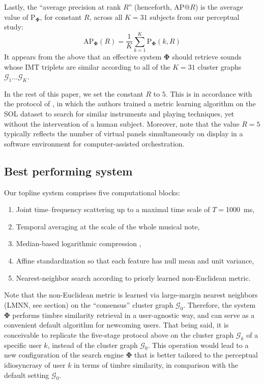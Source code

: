 \documentclass{bmcart}
\newcommand{\lnameref}[1]{%
\bgroup
\let\nmu\MakeLowercase
\nameref{#1}\egroup}
\newcommand{\nmu}{}
\begin{document}
Lastly, the ``average precision at rank $R$'' (henceforth, AP@$R$) is the average value of $\mathrm{P}_{\mathbf{\Phi}}$, for constant $R$, across all $K=31$ subjects from our perceptual study:
\begin{equation}
\mathrm{AP}_{\mathbf{\Phi}}(R) =
\dfrac{1}{K}
\sum_{k=1}^{K}
\mathrm{P}_{\mathbf{\Phi}}(k, R)
\end{equation}
It appears from the above that an effective system $\mathbf{\Phi}$ should retrieve sounds whose IMT triplets are similar according to all of the $K=31$ cluster graphs $\mathcal{G}_1 \ldots \mathcal{G}_K$.

In the rest of this paper, we set the constant $R$ to $5$.
This is in accordance with the protocol of \cite{lostanlen2018extended}, in which the authors trained a metric learning algorithm on the SOL dataset to search for similar instruments and playing techniques, yet without the intervention of a human subject.
Moreover, note that the value $R=5$ typically reflects the number of virtual panels simultaneously on display in a software environment for computer-assisted orchestration.


\subsection*{Best performing system}
Our topline system comprises five computational blocks:
\begin{enumerate}
\item Joint time--frequency scattering up to a maximal time scale of $T=$\SI{1000}{\milli\second},
\item Temporal averaging at the scale of the whole musical note,
\item Median-based logarithmic compression \cite[Equation 1]{lostanlen2018extended},
\item Affine standardization so that each feature has null mean and unit variance,
\item Nearest-neighbor search according to priorly learned non-Euclidean metric.
\end{enumerate}
Note that the non-Euclidean metric is learned via large-margin nearest neighbors (LMNN, see \lnameref{sec:methods} section) on the ``consensus'' cluster graph $\mathcal{G}_0$.
Therefore, the system $\mathbf{\Phi}$ performs timbre similarity retrieval in a user-agnostic way, and can serve as a convenient default algorithm for newcoming users.
That being said, it is conceivable to replicate the five-stage protocol above on the cluster graph $\mathcal{G}_k$ of a specific user $k$, instead of the cluster graph $\mathcal{G}_0$.
This operation would lead to a new configuration of the search engine $\mathbf{\Phi}$ that is better tailored to the perceptual idiosyncrasy of user $k$ in terms of timbre similarity, in comparison with the default setting $\mathcal{G}_0$.
\end{document}
